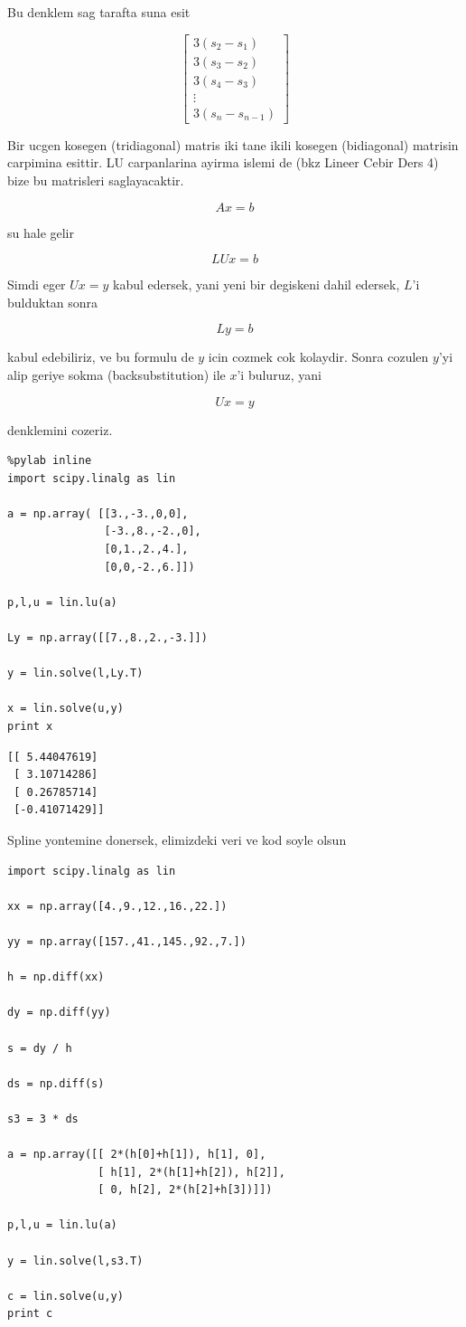 \documentclass[12pt,fleqn]{article}\usepackage{../common}
\begin{document}
Bu denklem sag tarafta suna esit 

$$ 
\left[\begin{array}{r}
3(s_2 - s_1) \\
3(s_3 - s_2) \\
3(s_4 - s_3) \\
\vdots \\
3(s_n - s_{n-1}) 
\end{array}\right]
 $$

Bir ucgen kosegen (tridiagonal) matris iki tane ikili kosegen (bidiagonal)
matrisin carpimina esittir. LU carpanlarina ayirma islemi de (bkz Lineer
Cebir Ders 4) bize bu matrisleri saglayacaktir. 

$$ Ax = b $$

su hale gelir

$$ LUx = b $$

Simdi eger $Ux = y$ kabul edersek, yani yeni bir degiskeni dahil edersek,
$L$'i bulduktan sonra

$$ Ly = b $$

kabul edebiliriz, ve bu formulu de $y$ icin cozmek cok kolaydir. Sonra
cozulen $y$'yi alip geriye sokma (backsubstitution) ile $x$'i buluruz, yani 

$$ Ux = y $$ 

denklemini cozeriz. 

\begin{verbatim}
%pylab inline
import scipy.linalg as lin

a = np.array( [[3.,-3.,0,0],
               [-3.,8.,-2.,0],
               [0,1.,2.,4.],
               [0,0,-2.,6.]])

p,l,u = lin.lu(a)

Ly = np.array([[7.,8.,2.,-3.]])

y = lin.solve(l,Ly.T)

x = lin.solve(u,y)
print x
\end{verbatim}

\begin{verbatim}
[[ 5.44047619]
 [ 3.10714286]
 [ 0.26785714]
 [-0.41071429]]
\end{verbatim}

Spline yontemine donersek, elimizdeki veri ve kod soyle olsun

\begin{verbatim}
import scipy.linalg as lin

xx = np.array([4.,9.,12.,16.,22.])

yy = np.array([157.,41.,145.,92.,7.])

h = np.diff(xx)

dy = np.diff(yy)

s = dy / h

ds = np.diff(s)

s3 = 3 * ds

a = np.array([[ 2*(h[0]+h[1]), h[1], 0],
              [ h[1], 2*(h[1]+h[2]), h[2]],
              [ 0, h[2], 2*(h[2]+h[3])]])

p,l,u = lin.lu(a)

y = lin.solve(l,s3.T)

c = lin.solve(u,y)
print c
\end{verbatim}
\end{document}
